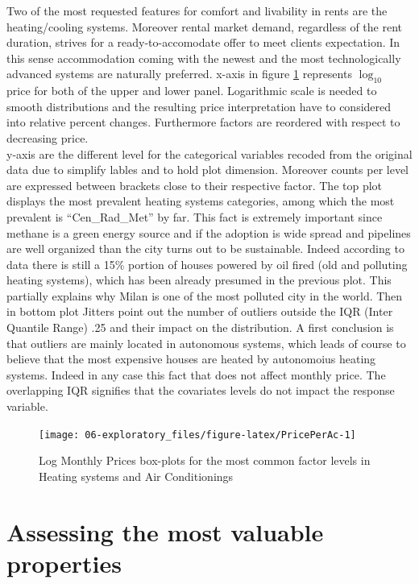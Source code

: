 \documentclass[
  12pt,
  a4paper,
  oneside]{book}
\theoremstyle{definition}
\theoremstyle{definition}
\theoremstyle{definition}
\theoremstyle{remark}
\begin{document}
Two of the most requested features for comfort and livability in rents are the heating/cooling systems. Moreover rental market demand, regardless of the rent duration, strives for a ready-to-accomodate offer to meet clients expectation. In this sense accommodation coming with the newest and the most technologically advanced systems are naturally preferred.
x-axis in figure \ref{fig:PricePerAc} represents \(\log_{10}\) price for both of the upper and lower panel. Logarithmic scale is needed to smooth distributions and the resulting price interpretation have to considered into relative percent changes. Furthermore factors are reordered with respect to decreasing price.\\
y-axis are the different level for the categorical variables recoded from the original data due to simplify lables and to hold plot dimension. Moreover counts per level are expressed between brackets close to their respective factor.
The top plot displays the most prevalent heating systems categories, among which the most prevalent is ``Cen\_Rad\_Met'' by far. This fact is extremely important since methane is a green energy source and if the adoption is wide spread and pipelines are well organized than the city turns out to be sustainable. Indeed according to data there is still a 15\% portion of houses powered by oil fired (old and polluting heating systems), which has been already presumed in the previous plot. This partially explains why Milan is one of the most polluted city in the world.
Then in bottom plot Jitters point out the number of outliers outside the IQR (Inter Quantile Range) .25 and their impact on the distribution. A first conclusion is that outliers are mainly located in autonomous systems, which leads of course to believe that the most expensive houses are heated by autonomoius heating systems. Indeed in any case this fact that does not affect monthly price. The overlapping IQR signifies that the covariates levels do not impact the response variable.

\begin{figure}

{\centering \texttt{[image: 06-exploratory\_files/figure-latex/PricePerAc-1]} 

}

\caption{Log Monthly Prices box-plots for the most common factor levels in Heating systems and Air Conditionings}\label{fig:PricePerAc}
\end{figure}

\hypertarget{mvp}{%
\section{Assessing the most valuable properties}\label{mvp}}
\end{document}
